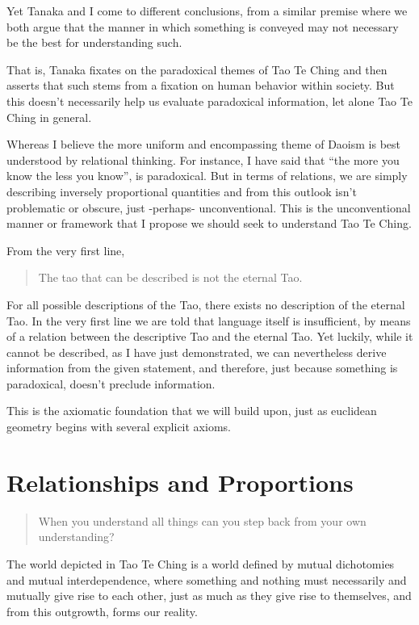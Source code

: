 Yet Tanaka and I come to different conclusions, from a similar premise where we both argue that the manner in which something is conveyed may not necessary be the best for understanding such.

That is, Tanaka fixates on the paradoxical themes of Tao Te Ching and then asserts that such stems from a fixation on human behavior within society. But this doesn’t necessarily help us evaluate paradoxical information, let alone Tao Te Ching in general. 

Whereas I believe the more uniform and encompassing theme of Daoism is best understood by relational thinking. For instance, I have said that “the more you know the less you know”, is paradoxical. But in terms of relations, we are simply describing inversely proportional quantities and from this outlook isn’t problematic or obscure, just -perhaps- unconventional. This is the unconventional manner or framework that I propose we should seek to understand Tao Te Ching.

From the very first line,
\begin{verse}
The tao that can be described is not the eternal Tao.\\
\end{verse}

For all possible descriptions of the Tao, there exists no description of the eternal Tao. In the very first line we are told that language itself is insufficient, by means of a relation between the descriptive Tao and the eternal Tao. Yet luckily, while it cannot be described, as I have just demonstrated, we can nevertheless derive information from the given statement, and therefore, just because something is paradoxical, doesn't preclude information.

This is the axiomatic foundation that we will build upon, just as euclidean geometry begins with several explicit axioms.


\section{Relationships and Proportions}

\begin{verse}
When you understand all things can you step back from your own understanding?\\
\end{verse}

The world depicted in Tao Te Ching is a world defined by mutual dichotomies and mutual interdependence, where something and nothing must necessarily and mutually give rise to each other, just as much as they give rise to themselves, and from this outgrowth, forms our reality.

